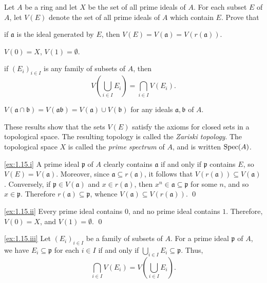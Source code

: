 \begin{exercise}
\label{ex:1.15}
Let $A$ be a ring and let $X$ be the set of all prime ideals of $A$.
For each subset $E$ of $A$, let $V(E)$ denote the set of all prime ideals of $A$ which contain $E$.
Prove that
\begin{rlist}
\item
\label{ex:1.15.i}
if $\mathfrak a$ is the ideal generated by $E$, then $V(E) = V(\mathfrak a) = V(r(\mathfrak a))$.
\item
\label{ex:1.15.ii}
$V(0) = X$, $V(1) = \emptyset$.
\item
\label{ex:1.15.iii}
if $(E_i)_{i\in I}$ is any family of subsets of $A$, then
\begin{equation*}
V\left(\bigcup_{i\in I} E_i\right)
= \bigcap_{i\in I} V(E_i).
\end{equation*}
\item
\label{ex:1.15.iv}
$V(\mathfrak a \cap \mathfrak b) = V(\mathfrak a \mathfrak b) = V(\mathfrak a) \cup V(\mathfrak b)$ for any ideals $\mathfrak a, \mathfrak b$ of $A$.
\end{rlist}

These results show that the sets $V(E)$ satisfy the axioms for closed sets in a topological space.
The resulting topology is called the \emph{Zariski topology}.
The topological space $X$ is called the \emph{prime spectrum} of $A$, and is written $\operatorname{Spec}(A)$.
\end{exercise}

\noindent
\ref{ex:1.15.i}
A prime ideal $\mathfrak p$ of $A$ clearly contains $\mathfrak a$ if and only if $\mathfrak p$ contains $E$, so $V(E) = V(\mathfrak a)$.
Moreover, since $\mathfrak a \subseteq r(\mathfrak a)$, it follows that $V(r(\mathfrak a)) \subseteq V(\mathfrak a)$.
Conversely, if $\mathfrak p \in V(\mathfrak a)$ and $x \in r(\mathfrak a)$, then $x^n \in \mathfrak a \subseteq \mathfrak p$ for some $n$, and so $x \in \mathfrak p$.
Therefore $r(\mathfrak a) \subseteq \mathfrak p$, whence $V(\mathfrak a) \subseteq V(r(\mathfrak a))$.
\qed

\noindent
\ref{ex:1.15.ii}
Every prime ideal contains $0$, and no prime ideal contains $1$.
Therefore, $V(0)=X$, and $V(1) = \emptyset$.
\qed

\noindent
\ref{ex:1.15.iii}
Let $(E_i)_{i\in I}$ be a family of subsets of $A$.
For a prime ideal $\mathfrak p$ of $A$, we have $E_i \subseteq \mathfrak p$ for each $i \in I$ if and only if $\bigcup_{i\in I} E_i \subseteq \mathfrak p$.
Thus,
\begin{equation*}
\bigcap_{i\in I} V(E_i) = V\left(\bigcup_{i\in I} E_i\right).
\tag*{\qed}
\end{equation*}

